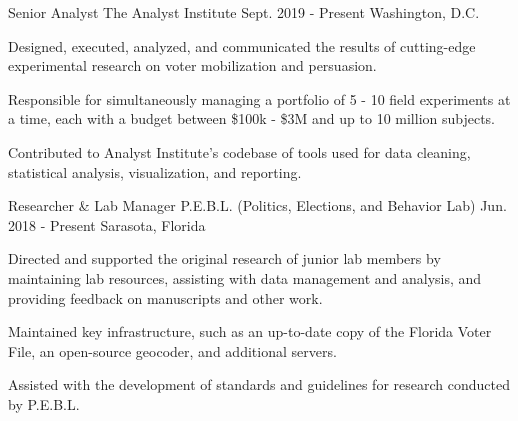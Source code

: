 

\begin{cventries}

    \cventry
      {Senior Analyst} %
      {The Analyst Institute} %
      {Sept. 2019 - Present} %
      {Washington, D.C.} %
      {
        \begin{cvitems} %
          \item {Designed, executed, analyzed, and communicated the results of cutting-edge experimental research on voter mobilization and persuasion.}
          \item {Responsible for simultaneously managing a portfolio of 5 - 10 field experiments at a time, each with a budget between \$100k - \$3M and up to 10 million subjects.}
          \item {Contributed to Analyst Institute's codebase of tools used for data cleaning, statistical analysis, visualization, and reporting.}
      \end{cvitems}
      }


    \cventry
      {Researcher \& Lab Manager} %
      {P.E.B.L. (Politics, Elections, and Behavior Lab)} %
      {Jun. 2018 - Present} %
      {Sarasota, Florida} %
      {
        \begin{cvitems} %
          \item {Directed and supported the original research of junior lab members by maintaining lab resources, assisting with data management and analysis, and providing feedback on manuscripts and other work.}
          \item {Maintained key infrastructure, such as an up-to-date copy of the Florida Voter File, an open-source geocoder, and additional servers.}
          \item {Assisted with the development of standards and guidelines for research conducted by P.E.B.L.}
      \end{cvitems}
      }


\end{cventries}
